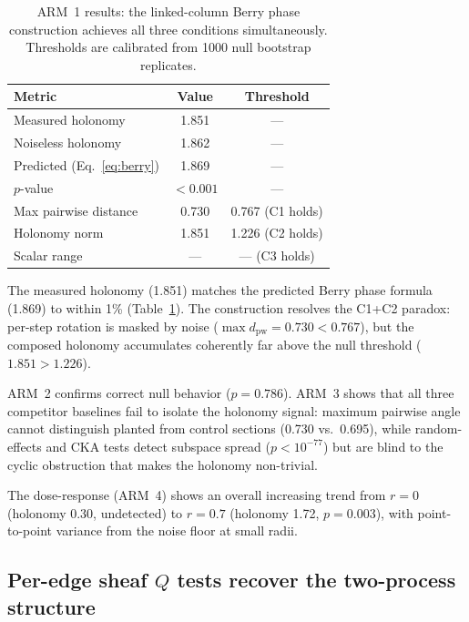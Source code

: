 \documentclass[11pt]{article}
\begin{document}
\begin{table}[htbp]
\centering
\caption{ARM~1 results: the linked-column Berry phase construction
achieves all three conditions simultaneously. Thresholds are calibrated
from 1000 null bootstrap replicates.}
\label{tab:cocycle}
\begin{tabular}{@{}lcc@{}}
\toprule
Metric & Value & Threshold \\
\midrule
Measured holonomy & 1.851 & --- \\
Noiseless holonomy & 1.862 & --- \\
Predicted (Eq.~\ref{eq:berry}) & 1.869 & --- \\
$p$-value & $< 0.001$ & --- \\
\midrule
Max pairwise distance & 0.730 & 0.767 (C1 holds) \\
Holonomy norm & 1.851 & 1.226 (C2 holds) \\
Scalar range & --- & --- (C3 holds) \\
\bottomrule
\end{tabular}
\end{table}

The measured holonomy (1.851) matches the predicted Berry phase formula
(1.869) to within 1\% (Table~\ref{tab:cocycle}). The construction
resolves the C1+C2 paradox: per-step rotation is masked by noise
($\max d_{\mathrm{pw}} = 0.730 < 0.767$), but the composed holonomy
accumulates coherently far above the null threshold
($1.851 > 1.226$).

ARM~2 confirms correct null behavior ($p = 0.786$). ARM~3 shows that
all three competitor baselines fail to isolate the holonomy signal:
maximum pairwise angle cannot distinguish planted from control sections
(0.730 vs.\ 0.695), while random-effects and CKA tests detect subspace
spread ($p < 10^{-77}$) but are blind to the cyclic obstruction that
makes the holonomy non-trivial.

The dose-response (ARM~4) shows an overall increasing trend from
$r = 0$ (holonomy 0.30, undetected) to $r = 0.7$ (holonomy 1.72,
$p = 0.003$), with point-to-point variance from the noise floor at
small radii.

\subsection{Per-edge sheaf $Q$ tests recover the two-process structure}
\end{document}
